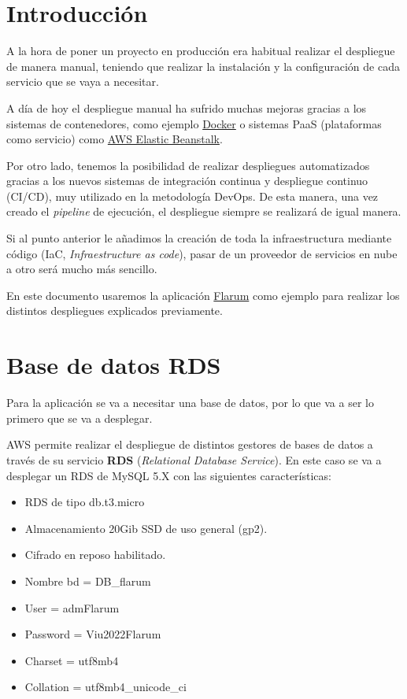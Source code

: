 \documentclass{\ClassPath/viu-tfm-template}
\begin{document}
    \graphicspath{{../VIU_TFM_LaTeX_template/}}

    \coverpage

    \tableofcontents

\chapter{Introducción}

A la hora de poner un proyecto en producción era habitual realizar el despliegue de manera manual, teniendo que realizar la instalación y la configuración de cada servicio que se vaya a necesitar.

A día de hoy el despliegue manual ha sufrido muchas mejoras gracias a los sistemas de contenedores, como ejemplo \href{https://www.docker.com/}{Docker} o sistemas PaaS (plataformas como servicio) como \href{https://en.wikipedia.org/wiki/AWS_Elastic_Beanstalk}{AWS Elastic Beanstalk}.

Por otro lado, tenemos la posibilidad de realizar despliegues automatizados gracias a los nuevos sistemas de integración continua y despliegue continuo (CI/CD), muy utilizado en la metodología DevOps. De esta manera, una vez creado el \textit{pipeline} de ejecución, el despliegue siempre se realizará de igual manera.

Si al punto anterior le añadimos la creación de toda la infraestructura mediante código (IaC, \textit{Infraestructure as code}), pasar de un proveedor de servicios en nube a otro será mucho más sencillo.

En este documento usaremos la aplicación \href{https://flarum.org/}{Flarum} como ejemplo para realizar los distintos despliegues explicados previamente.


\chapter{Base de datos RDS}
Para la aplicación se va a necesitar una base de datos, por lo que va a ser lo primero que se va a desplegar.

AWS permite realizar el despliegue de distintos gestores de bases de datos a través de su servicio \textbf{RDS} (\textit{Relational Database Service}). En este caso se va a desplegar un RDS de MySQL 5.X con las siguientes características:

\begin{itemize}
    \item RDS de tipo db.t3.micro
    \item Almacenamiento 20Gib SSD de uso general (gp2).
    \item Cifrado en reposo habilitado.
    \item Nombre bd = DB\_flarum
    \item User = admFlarum
    \item Password = Viu2022Flarum
    \item Charset = utf8mb4
    \item Collation = utf8mb4\_unicode\_ci
\end{itemize}
\end{document}
